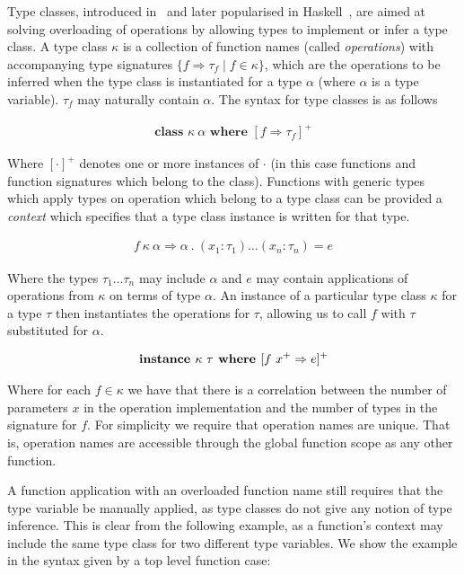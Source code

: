 Type classes, introduced in~\cite{Wadler:1989} and later popularised in
Haskell~\cite{Hall:1996}, are aimed at solving overloading of operations by
allowing types to implement or infer a type class. A type class $\kappa$ is a
collection of function names (called \emph{operations}) with accompanying type
signatures $\{ f \Rightarrow \tau_f \mid f \in \kappa \}$, which are the
operations to be inferred when the type class is instantiated for a type
$\alpha$ (where $\alpha$ is a type variable). $\tau_f$ may naturally contain
$\alpha$. The syntax for type classes is as follows

\begin{align*}
  \textbf{class } \kappa~\alpha \textbf{ where } [f \Rightarrow \tau_f]^+
\end{align*}

Where $[\cdot]^+$ denotes one or more instances of $\cdot$ (in this case
functions and function signatures which belong to the class). Functions with
generic types which apply types on operation which belong to a type class can
be provided a \emph{context} which specifies that a type class instance is
written for that type.

\begin{align*}
  f~\kappa~\alpha \Rightarrow \alpha~.~(x_1:\tau_1) \dots (x_n:\tau_n) = e
\end{align*}

Where the types $\tau_1 \dots \tau_n$ may include $\alpha$ and $e$ may contain
applications of operations from $\kappa$ on terms of type $\alpha$. An instance
of a particular type class $\kappa$ for a type $\tau$ then instantiates the
operations for $\tau$, allowing us to call $f$ with $\tau$ substituted for
$\alpha$.

\begin{align*}
  \textbf{instance } \kappa~\tau \textbf{ where } [f~x^+ \Rightarrow e]^+
\end{align*}

Where for each $f \in \kappa$ we have that there is a correlation between the
number of parameters $x$ in the operation implementation and the number of
types in the signature for $f$. For simplicity we require that operation names
are unique. That is, operation names are accessible through the global function
scope as any other function.

A function application with an overloaded function name still requires that the
type variable be manually applied, as type classes do not give any notion of
type inference. This is clear from the following example, as a function's
context may include the same type class for two different type variables. We
show the example in the syntax given by a top level function case:

